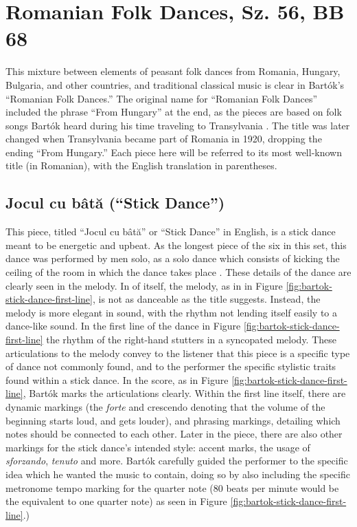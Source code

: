 \section{Romanian Folk Dances, Sz. 56, BB 68}

This mixture between elements of peasant folk dances from Romania, Hungary, Bulgaria, and other countries, and traditional classical music is clear in Bartók's ``Romanian Folk Dances.'' The original name for ``Romanian Folk Dances'' included the phrase ``From Hungary'' at the end, as the pieces are based on folk songs Bartók heard during his time traveling to Transylvania \autocite{Burkholder_Grout_Palisca_2014}. The title was later changed when Transylvania became part of Romania in 1920, dropping the ending ``From Hungary.'' Each piece here will be referred to its most well-known title (in Romanian), with the English translation in parentheses.

\subsection{Jocul cu bâtă (``Stick Dance'')}

This piece, titled ``Jocul cu bâtă'' or ``Stick Dance'' in English, is a stick dance meant to be energetic and upbeat. As the longest piece of the six in this set, this dance was performed by men solo, as a solo dance which consists of kicking the ceiling of the room in which the dance takes place \autocite{Weissmann_1969}. These details of the dance are clearly seen in the melody. In of itself, the melody, as in  in Figure \ref{fig:bartok-stick-dance-first-line}\autocite{Lung_2016}, is not as danceable as the title suggests. Instead, the melody is more elegant in sound, with the rhythm not lending itself easily to a dance-like sound. In the first line of the dance in Figure \ref{fig:bartok-stick-dance-first-line}\autocite{Lung_2016} the rhythm of the right-hand stutters in a syncopated melody. These articulations to the melody convey to the listener that this piece is a specific type of dance not commonly found, and to the performer the specific stylistic traits found within a stick dance. In the score, as in Figure  \ref{fig:bartok-stick-dance-first-line}\autocite{Lung_2016}, Bartók marks the articulations clearly. Within the first line itself, there are dynamic markings (the \textit{forte} and crescendo denoting that the volume of the beginning starts loud, and gets louder), and phrasing markings, detailing which notes should be connected to each other. Later in the piece, there are also other markings for the stick dance's intended style: accent marks, the usage of \textit{sforzando}, \textit{tenuto} and more. Bartók carefully guided the performer to the specific idea which he wanted the music to contain, doing so by also including the specific metronome tempo marking for the quarter note (80 beats per minute would be the equivalent to one quarter note) as seen in Figure \ref{fig:bartok-stick-dance-first-line}.\autocite{Lung_2016})

